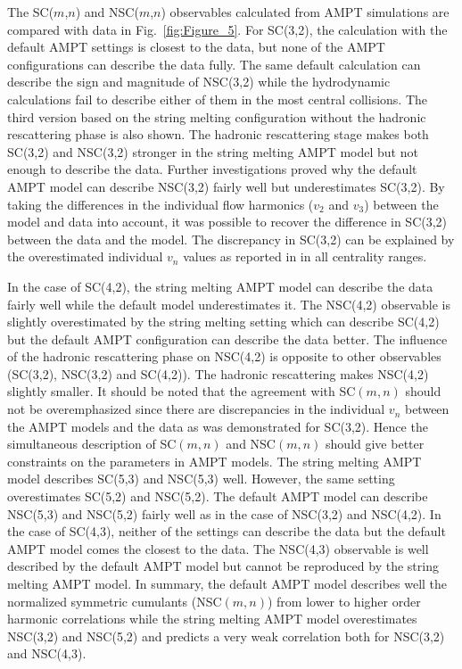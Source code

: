 The SC($m$,$n$) and NSC($m$,$n$) observables calculated from AMPT simulations are compared with data in Fig.~\ref{fig:Figure_5}.
For SC(3,2), the calculation with the default AMPT settings is closest to the data, but none of the AMPT configurations can describe the data fully. 
The same default calculation can describe the sign and magnitude of NSC(3,2) while the hydrodynamic calculations fail to describe either of them in the most central collisions.
The third version based on the string melting configuration without the hadronic rescattering phase is also shown.
The hadronic rescattering stage makes both SC(3,2) and NSC(3,2) stronger in the string melting AMPT model but not enough to describe the data.
Further investigations proved why the default AMPT model can describe NSC(3,2) fairly well but underestimates SC(3,2). By taking the differences in the individual flow harmonics ($v_2$ and $v_3$) between the model and data into account, it was possible to recover the difference in SC(3,2) between the data and the model. The discrepancy in SC(3,2) can be explained by the overestimated individual $v_n$ values as reported in \cite{Adam:2016nfo} in all centrality ranges. 

In the case of SC(4,2), the string melting AMPT model can describe the data fairly well while the default model underestimates it.
The NSC(4,2) observable is slightly overestimated by the string melting setting which can describe SC(4,2) but the default AMPT configuration can describe the data better.
The influence of the hadronic rescattering phase on NSC(4,2) is opposite to other observables (SC(3,2), NSC(3,2) and SC(4,2)). The hadronic rescattering makes NSC(4,2) slightly smaller.
It should be noted that the agreement with SC$(m,n)$ should not be overemphasized since there are discrepancies in the individual $v_n$ between the AMPT models and the data as was demonstrated for SC(3,2).
Hence the simultaneous description of SC$(m,n)$ and NSC$(m,n)$ should give better constraints on the parameters in AMPT models.
The string melting AMPT model describes SC(5,3) and NSC(5,3) well. However, the same setting overestimates SC(5,2) and NSC(5,2). 
The default AMPT model can describe NSC(5,3) and NSC(5,2) fairly well as in the case of NSC(3,2) and NSC(4,2).
In the case of SC(4,3), neither of the settings can describe the data but the default AMPT model comes the closest to the data. 
The NSC(4,3) observable is well described by the default AMPT model but cannot be reproduced by the string melting AMPT model.
In summary, the default AMPT model describes well the normalized symmetric cumulants (NSC$(m,n)$) from lower to higher order harmonic correlations while the string melting AMPT model overestimates NSC(3,2) and NSC(5,2) and predicts a very weak correlation both for NSC(3,2) and NSC(4,3). 

